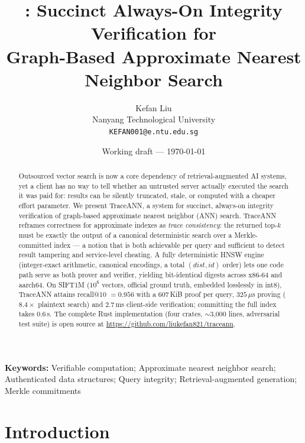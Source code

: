 \documentclass[11pt]{article}
\title{\sys{}: Succinct Always-On Integrity Verification for\\
Graph-Based Approximate Nearest Neighbor Search}
\author{Kefan Liu\\ Nanyang Technological University\\
\texttt{KEFAN001@e.ntu.edu.sg}}
\date{Working draft --- \today}
\newcommand{\sys}{TraceANN}
\begin{document}
\maketitle

\begin{abstract}
Outsourced vector search is now a core dependency of
retrieval-augmented AI systems, yet a client has no way to tell
whether an untrusted server actually executed the search it was paid
for: results can be silently truncated, stale, or computed with a
cheaper effort parameter. We present \sys{}, a system for succinct,
always-on integrity verification of graph-based approximate nearest
neighbor (ANN) search. \sys{} reframes correctness for approximate
indexes as \emph{trace consistency}: the returned top-$k$ must be
exactly the output of a canonical deterministic search over a
Merkle-committed index --- a notion that is both achievable per query
and sufficient to detect result tampering and service-level cheating.
A fully deterministic HNSW engine (integer-exact arithmetic, canonical
encodings, a total $(\mathit{dist},\mathit{id})$ order) lets one code
path serve as both prover and verifier, yielding bit-identical digests
across x86-64 and aarch64. On SIFT1M ($10^6$ vectors, official ground
truth, embedded losslessly in int8), \sys{} attains recall@10 $=0.956$
with a $607$\,KiB proof per query, $325\,\mu$s proving ($8.4\times$
plaintext search) and $2.7$\,ms client-side verification; committing
the full index takes $0.6$\,s. The complete Rust implementation (four
crates, $\sim$3{,}000 lines, adversarial test suite) is open source at
\url{https://github.com/liukefan821/traceann}.
\end{abstract}

\noindent\textbf{Keywords:} Verifiable computation; Approximate
nearest neighbor search; Authenticated data structures; Query
integrity; Retrieval-augmented generation; Merkle commitments

\section{Introduction}\label{sec:intro}
\end{document}
